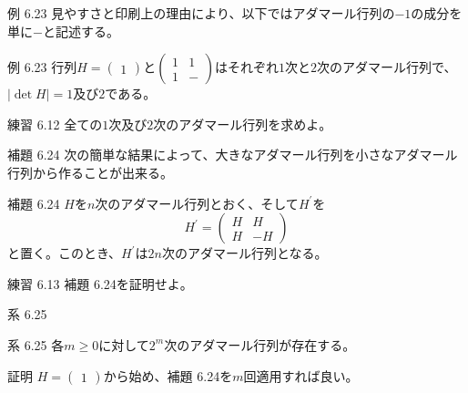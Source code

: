 \documentclass[dvipdfmx,10pt,jsarticle]{beamer}
\begin{document}
  \begin{frame}{例 6.23}
    見やすさと印刷上の理由により、以下ではアダマール行列の$-1$の成分を単に$-$と記述する。

    \begin{block}{例 6.23}
      行列$H = \begin{pmatrix} 1 \end{pmatrix}$と$\begin{pmatrix} 1 & 1 \\ 1 & -\end{pmatrix}$はそれぞれ$1$次と$2$次のアダマール行列で、$\mid \det H \mid = 1$及び$2$である。
    \end{block}
    \vspace{1cm}
    \begin{block}{練習 6.12}
        全ての$1$次及び$2$次のアダマール行列を求めよ。 \\
    \end{block}
  \end{frame}

  \begin{frame}{補題 6.24}
    次の簡単な結果によって、大きなアダマール行列を小さなアダマール行列から作ることが出来る。

    \begin{block}{補題 6.24}
      $H$を$n$次のアダマール行列とおく、そして$H^\prime$を
      \[H^\prime = \begin{pmatrix} H & H \\ H & -H\end{pmatrix}\]
      と置く。このとき、$H^\prime$は$2n$次のアダマール行列となる。
    \end{block}
    \vspace{1cm}
     \begin{block}{練習 6.13}
        補題 6.24を証明せよ。
    \end{block}
  \end{frame}

  \begin{frame}{系 6.25}
    \begin{block}{系 6.25}
      各$m \geq 0$に対して$2^m$次のアダマール行列が存在する。
    \end{block}
      
    \begin{block}{証明}
        $H = \begin{pmatrix}  1\end{pmatrix}$から始め、補題 6.24を$m$回適用すれば良い。
    \end{block}
  \end{frame}
\end{document}

